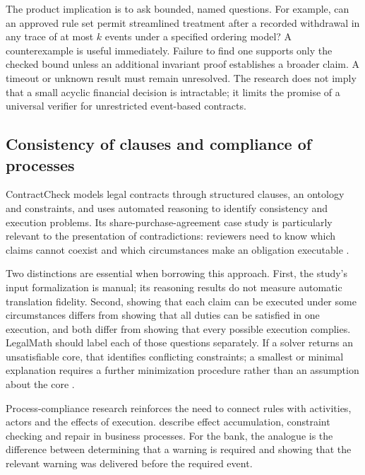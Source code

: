 The product implication is to ask bounded, named questions. For example, can an
approved rule set permit streamlined treatment after a recorded withdrawal in
any trace of at most $k$ events under a specified ordering model? A counterexample
is useful immediately. Failure to find one supports only the checked bound unless
an additional invariant proof establishes a broader claim. A timeout or unknown
result must remain unresolved. The research does not imply that a small acyclic
financial decision is intractable; it limits the promise of a universal verifier
for unrestricted event-based contracts.



\subsection{Consistency of clauses and compliance of processes}

ContractCheck models legal contracts through structured clauses, an ontology and
constraints, and uses automated reasoning to identify consistency and execution
problems. Its share-purchase-agreement case study is particularly relevant to
the presentation of contradictions: reviewers need to know which claims cannot
coexist and which circumstances make an obligation executable
\citep[secs.~3--7]{contractcheck2025}.

Two distinctions are essential when borrowing this approach. First, the study's
input formalization is manual; its reasoning results do not measure automatic
translation fidelity. Second, showing that each claim can be executed under
some circumstances differs from showing that all duties can be satisfied in one
execution, and both differ from showing that every possible execution complies.
LegalMath should label each of those questions separately. If a solver returns
an unsatisfiable core, that identifies conflicting constraints; a smallest or
minimal explanation requires a further minimization procedure rather than an
assumption about the core \citep[secs.~4--5, 8]{contractcheck2025}.

Process-compliance research reinforces the need to connect rules with activities,
actors and the effects of execution. \citet{ghose2007} describe effect accumulation,
constraint checking and repair in business processes. For the bank, the analogue
is the difference between determining that a warning is required and showing
that the relevant warning was delivered before the required event.

